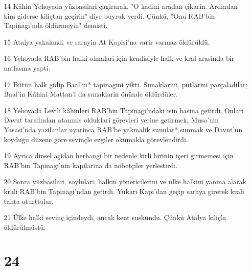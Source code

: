 \par 14 Kâhin Yehoyada yüzbasilari çagirarak, "O kadini aradan çikarin. Ardindan kim giderse kiliçtan geçirin" diye buyruk verdi. Çünkü, "Onu RAB'bin Tapinagi'nda öldürmeyin" demisti.
\par 15 Atalya yakalandi ve sarayin At Kapisi'na varir varmaz öldürüldü.
\par 16 Yehoyada RAB'bin halki olmalari için kendisiyle halk ve kral arasinda bir antlasma yapti.
\par 17 Bütün halk gidip Baal'in* tapinagini yikti. Sunaklarini, putlarini parçaladilar; Baal'in Kâhini Mattan'i da sunaklarin önünde öldürdüler.
\par 18 Yehoyada Levili kâhinleri RAB'bin Tapinagi'ndaki isin basina getirdi. Onlari Davut tarafindan atanmis olduklari görevleri yerine getirmek, Musa'nin Yasasi'nda yazilanlar uyarinca RAB'be yakmalik sunular* sunmak ve Davut'un koydugu düzene göre sevinçle ezgiler okumakla görevlendirdi.
\par 19 Ayrica dinsel açidan herhangi bir nedenle kirli birinin içeri girmemesi için RAB'bin Tapinagi'nin kapilarina da nöbetçiler yerlestirdi.
\par 20 Sonra yüzbasilari, soylulari, halkin yöneticilerini ve ülke halkini yanina alarak krali RAB'bin Tapinagi'ndan getirdi. Yukari Kapi'dan geçip saraya girerek krali tahta oturttular.
\par 21 Ülke halki sevinç içindeydi, ancak kent suskundu. Çünkü Atalya kiliçla öldürülmüstü.

\chapter{24}

